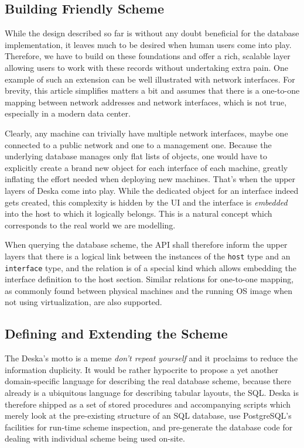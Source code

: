 \documentclass[a4paper]{jpconf}
\begin{document}
\subsection{Building Friendly Scheme}

While the design described so far is without any doubt beneficial for the database implementation, it leaves much to be desired when
human users come into play.  Therefore, we have to build on these foundations and offer a rich, scalable layer allowing users to work
with these records without undertaking extra pain.  One example of such an extension can be well illustrated with network interfaces.
For brevity, this article simplifies matters a bit and assumes that there is a one-to-one mapping between network addresses and network
interfaces, which is not true, especially in a modern data center.

Clearly, any machine can trivially have multiple network interfaces, maybe one connected to a public network and one to a management
one.  Because the underlying database manages only flat lists of objects, one would have to explicitly create a brand new object for
each interface of each machine, greatly inflating the effort needed when deploying new machines.  That's when the upper layers of Deska
come into play.  While the dedicated object for an interface indeed gets created, this complexity is hidden by the UI and the interface
is {\em embedded} into the host to which it logically belongs.  This is a natural concept which corresponds to the real world we are
modelling.

When querying the database scheme, the API shall therefore inform the upper layers that there is a logical link between the instances
of the {\tt host} type and an {\tt interface} type, and the relation is of a special kind which allows embedding the interface
definition to the host section.  Similar relations for one-to-one mapping, as commonly found between physical machines and the running
OS image when not using virtualization, are also supported.

\subsection{Defining and Extending the Scheme}

The Deska's motto is a meme {\em don't repeat yourself} and it proclaims to reduce the information duplicity.  It would be rather
hypocrite to propose a yet another domain-specific language for describing the real database scheme, because there already is a
ubiquitous language for describing tabular layouts, the SQL.  Deska is therefore shipped as a set of stored procedures and accompanying
scripts which merely look at the pre-existing structure of an SQL database, use PostgreSQL's facilities for run-time scheme inspection,
and pre-generate the database code for dealing with individual scheme being used on-site.
\end{document}
